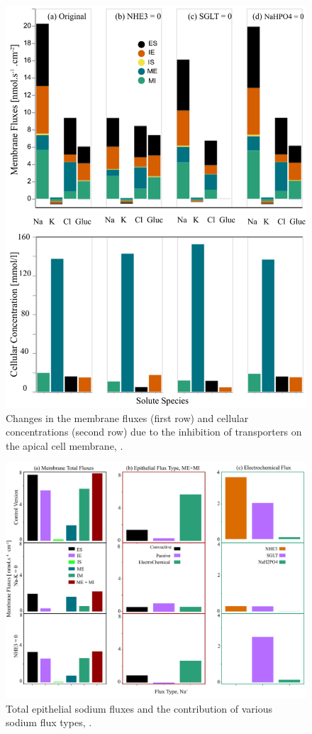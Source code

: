 \documentclass[fleqn,10pt]{physiome}
\begin{document}
\begin{figure}[h!]\centering
\includegraphics[width=1\linewidth]{Figure8.pdf}
\caption{Changes in the membrane fluxes (first row) and cellular concentrations (second row) due to the inhibition of transporters on the apical cell membrane, \cite[Figure 8]{noroozbabaee2022modular}.}
\label{fig:Figure8}
\end{figure}
\clearpage 
\pagebreak
\newpage

\begin{figure}[h!]
\includegraphics[width=1\linewidth]{Figure7.pdf}
\centering
\caption{Total epithelial sodium fluxes and the contribution of various sodium flux types, \cite[Figure 7]{noroozbabaee2022modular}. }
\label{fig:Figure7}
\end{figure}
\end{document}
